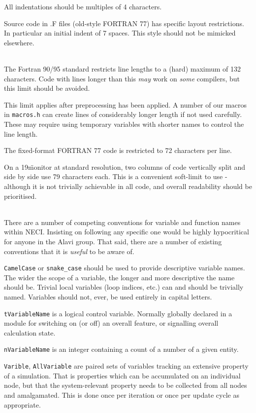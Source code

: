 \documentclass[a4paper,notitlepage]{scrreprt}
\newenvironment{packed_itemize}{
	\begin{itemize}
		\setlength{\itemsep}{1pt}
		\setlength{\parskip}{0pt}
		\setlength{\parsep}{0pt}
	}{\end{itemize}}
\newcommand\headitem[1]{\needspace{1.5\baselineskip}\item[{\boldmath #1 \nopagebreak}] \hfill \\ \nopagebreak}
\let\code\lstinline
\begin{document}
\begin{description}
		All indentations should be multiples of 4 characters.

		Source code in \textasteriskcentered.F files (old-style FORTRAN 77)
		has specific layout restrictions. In particular an initial indent of
		7 spaces. This style should not be mimicked elsewhere.

	\headitem{Code line length}
		The Fortran 90/95 standard restricts line lengths to a (hard) maximum
		of 132 characters. Code with lines longer than this \emph{may} work
		on \emph{some} compilers, but this limit should be avoided.

		This limit applies after preprocessing has been applied. A number of
		our macros in \code{macros.h} can create lines of considerably
		longer length if not used carefully. These may require using temporary
		variables with shorter names to control the line length.

		The fixed-format FORTRAN 77 code is restricted to 72 characters per
		line.

		On a 19\" monitor at standard resolution, two columns of code
		vertically split and side by side use 79 characters each. This is a
		convenient soft-limit to use - although it is not trivially achievable
		in all code, and overall readability should be prioritised.

	\headitem{Variable name conventions}
		There are a number of competing conventions for variable and function
		names within NECI. Insisting on following any specific one would be
		highly hypocritical for anyone in the Alavi group. That said, there
		are a number of existing conventions that it is \emph{useful} to be
		aware of.
		\begin{packed_itemize}
			\item
				\code{CamelCase} or \code{snake_case} should be used
				to provide descriptive variable names. The wider the scope of
				a variable, the longer and more descriptive the name should be.
				Trivial local variables (loop indices, etc.) can and should be
				trivially named. Variables should not, ever, be used entirely
				in capital letters.
			\item
				\code{tVariableName} is a logical control variable.
				Normally globally declared in a module for switching on (or
				off) an overall feature, or signalling overall calculation
				state.
			\item
				\code{nVariableName} is an integer containing a count of
				a number of a given entity.

			\item
				\code{Varible}, \code{AllVariable} are paired sets of
				variables tracking an extensive property of a simulation. That
				is properties which can be accumulated on an individual node,
				but that the system-relevant property needs to be collected
				from all nodes and amalgamated. This is done once per iteration
				or once per update cycle as appropriate.
		\end{packed_itemize}


\end{description}
\end{document}
